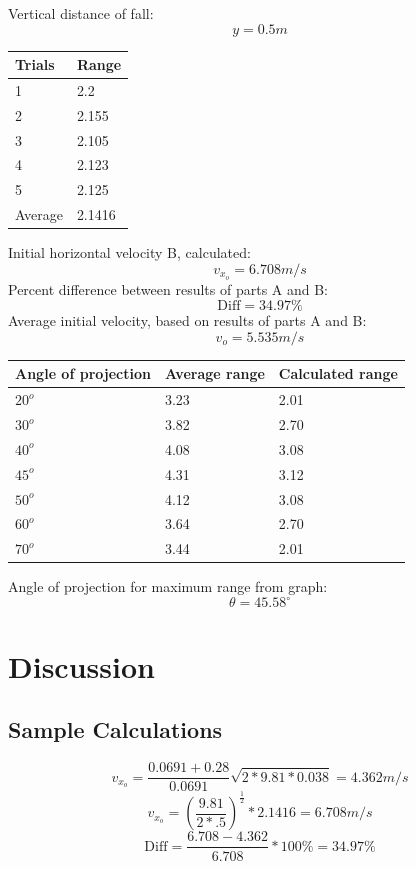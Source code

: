 \documentclass[11pt, titlepage]{article}
\begin{document}
\pagebreak
\noindent Vertical distance of fall:
$$y = 0.5 m$$
\begin{center}
\begin{tabular}
{|m{7em}|m{7em}|}
\hline
Trials & Range\\
\hline
1 & 2.2\\
\hline
2 & 2.155\\
\hline
3 & 2.105\\
\hline
4 & 2.123\\
\hline
5 & 2.125\\
\hline
Average & 2.1416\\
\hline
\end{tabular}
\end{center}
Initial horizontal velocity B, calculated:
$$v_{x_o} = 6.708 m/s$$
Percent difference between results of parts A and B:
$$\text{Diff} = 34.97\%$$
Average initial velocity, based on results of parts A and B:
$$v_o = 5.535 m/s$$
\begin{center}
\begin{tabular}
{|m{7em}|m{7em}|m{7em}|}
\hline
Angle of projection & Average range & Calculated range\\
\hline
$20^o$ & 3.23 & 2.01\\
\hline
$30^o$ & 3.82 & 2.70\\
\hline
$40^o$ & 4.08 & 3.08\\
\hline
$45^o$ & 4.31 & 3.12\\
\hline
$50^o$ & 4.12 & 3.08\\
\hline
$60^o$ & 3.64 & 2.70\\
\hline
$70^o$ & 3.44 & 2.01\\
\hline
\end{tabular}
\end{center}
Angle of projection for maximum range from graph:
$$ \theta = 45.58^\circ$$
\pagebreak
\section*{Discussion}
\subsection*{Sample Calculations}
$$v_{x_o} = \frac{0.0691+0.28}{0.0691}\sqrt{2\ast9.81\ast0.038} = 4.362 m/s$$
$$v_{x_o} = (\frac{9.81}{2\ast.5})^\frac{1}{2}\ast2.1416 = 6.708 m/s$$
$$\text{Diff} = \frac{6.708-4.362}{6.708}\ast100\% = 34.97\%$$
\end{document}
